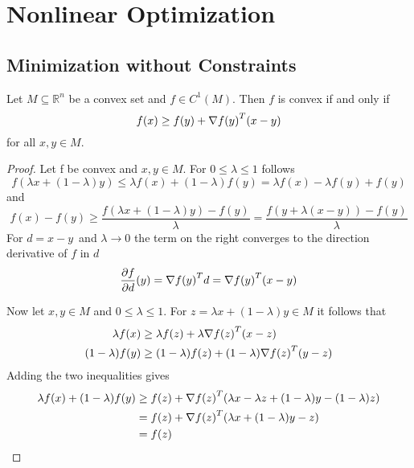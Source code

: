 
\newpage
\section{Nonlinear Optimization}
\subsection{Minimization without Constraints}
\bigskip


\begin{lemma}\label{thm:lemma_gradient_inequality}
    Let \(M \subseteq \mathbb{R}^n \) be a convex set and \(f \in C^1(M)\). Then \(f\) is convex if and only if
    \[
        f(x) \ge f(y) + \nabla {f(y)}^T (x - y)
    \]
    for all \(x, y \in M \).
\end{lemma}

\begin{proof}
    Let f be convex and \(x, y \in M\). For \( 0 \le \lambda \le 1 \) follows
    \[
        f(\lambda x + (1 - \lambda) y) \le \lambda f(x) + (1 - \lambda)f(y) =  \lambda f(x) - \lambda f(y) + f(y)
    \]
    and
    \[
        f(x) - f(y) \ge \frac{f(\lambda x + (1 - \lambda) y) - f(y)}{\lambda}
        = \frac{f(y + \lambda (x - y)) - f(y)}{\lambda}
    \]
    For \( d = x - y \)\ and \( \lambda \to 0 \) the term on the right converges to the direction derivative of \( f \)
    in \( d \)
    \[
        \frac{\partial f}{\partial d}(y) = \nabla{f(y)}^T d = \nabla{f(y)}^T (x - y)
    \]

    Now let \( x, y \in M \) and  \( 0 \le \lambda \le 1 \). For \( z = \lambda x + (1 - \lambda) y \in M \)
    it follows that
    \[
        \begin{split}
            \lambda f(x) & \ge \lambda f(z) + \lambda \nabla {f(z)}^T (x - z) \\
            (1 - \lambda) f(y) & \ge (1 - \lambda) f(z) + (1 - \lambda) \nabla {f(z)}^T (y - z)
        \end{split}
    \]
    Adding the two inequalities gives
    \[
        \begin{split}
            \lambda f(x) + (1 - \lambda) f(y)
            & \ge f(z) + \nabla {f(z)}^T(\lambda x - \lambda z + (1- \lambda) y - (1-\lambda)z) \\
            & = f(z) + \nabla {f(z)}^T(\lambda x + (1- \lambda) y - z) \\
            & = f(z)
        \end{split}
    \]
\end{proof}
\bigskip


